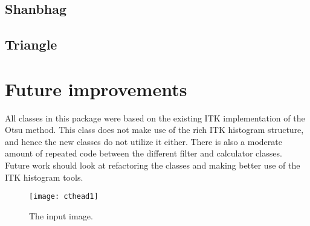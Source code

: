 \documentclass{InsightArticle}
\begin{document}
\subsection{Shanbhag}
\subsection{Triangle}


\section{Future improvements}
All classes in this package were based on the existing ITK
implementation of the Otsu method. This class does not make use of the
rich ITK histogram structure, and hence the new classes do not utilize
it either. There is also a moderate amount of repeated code between
the different filter and calculator classes. Future work should look
at refactoring the classes and making better use of the ITK histogram
tools.







\begin{figure}[htbp]
\centering
\texttt{[image: cthead1]}
\caption{The input image.\label{cthead1}}
\end{figure}


\appendix





\nocite{ITKSoftwareGuide}
\end{document}
